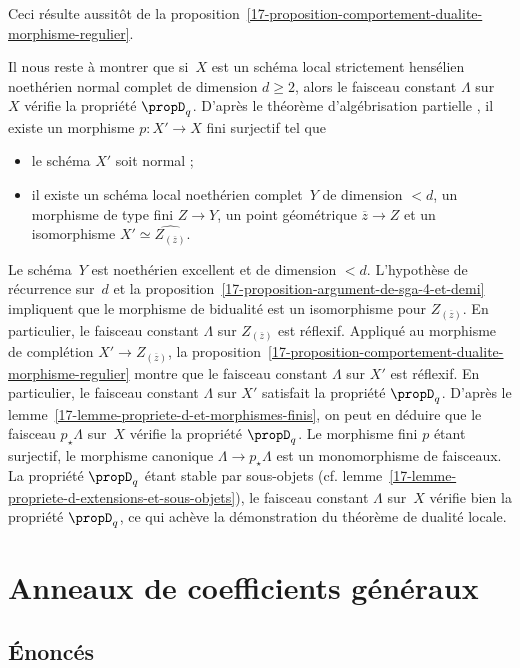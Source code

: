\documentclass[10pt]{../fichiers-configuration-latex/smfart}
\begin{document}
Ceci résulte aussitôt de la 
proposition~\ref{17-proposition-comportement-dualite-morphisme-regulier}.

\bigskip

Il nous reste à montrer que si $X$ est un schéma local strictement
hensélien noethérien normal complet de dimension $d\geq 2$, alors
le faisceau constant $\Lambda$ sur $X$ vérifie la propriété $\propD_q$.
D'après le théorème d'algébrisation
partielle ,
il existe un morphisme $p\colon X'\to X$ fini surjectif tel que
\begin{itemize}
\item le schéma $X'$ soit normal ;
\item il existe un schéma local noethérien complet $Y$ de
dimension $<d$, un morphisme de type fini $Z\to Y$, un point géométrique
$\overline z\to Z$ et un isomorphisme $X'\simeq \widehat{Z_{(\overline z)}}$.
\end{itemize}

Le schéma $Y$ est noethérien excellent et de dimension $<d$. L'hypothèse
de récurrence sur $d$ et la
proposition~\ref{17-proposition-argument-de-sga-4-et-demi} impliquent que le
morphisme de bidualité est un isomorphisme pour $Z_{(\overline z)}$.  En
particulier, le faisceau constant $\Lambda$ sur $Z_{(\overline z)}$ est
réflexif. Appliqué au morphisme de complétion $X'\to Z_{(\overline z)}$,
la proposition~\ref{17-proposition-comportement-dualite-morphisme-regulier}
montre que le faisceau constant $\Lambda$ sur $X'$ est réflexif.
En particulier, le faisceau constant $\Lambda$ sur $X'$ satisfait
la propriété $\propD_q$.
D'après le lemme~\ref{17-lemme-propriete-d-et-morphismes-finis}, on peut en
déduire que le faisceau
$p_\star\Lambda$ sur $X$ vérifie la propriété $\propD_q$. Le morphisme fini
$p$ étant surjectif, le morphisme canonique $\Lambda\to p_\star\Lambda$ est
un monomorphisme de faisceaux. La propriété $\propD_q$ étant stable par
sous-objets (cf. lemme~\ref{17-lemme-propriete-d-extensions-et-sous-objets}),
le faisceau constant $\Lambda$ sur $X$ vérifie bien la propriété
$\propD_q$, ce qui achève la démonstration du théorème de dualité locale.

\section{Anneaux de coefficients généraux}%
\label{17-section-coefficients-generaux}
\subsection{Énoncés}%
\end{document}

